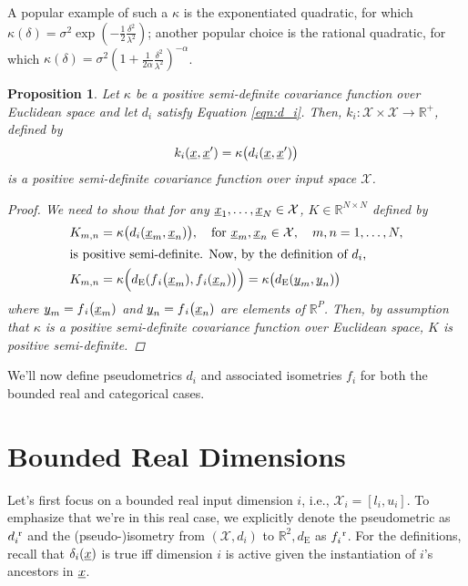 \documentclass{article}
\newcommand{\vect}[1]{\underline{\smash{#1}}}
\renewcommand{\v}[1]{\vect{#1}}
\newcommand{\reals}{\mathds{R}}
\newcommand{\sX}{\mathcal{X}}
\newcommand{\br}{^{\text{\textnormal{ r}}}}
\newtheorem{prop}[thm]{Proposition}
\begin{document}
A popular example of such a $\kappa$ is the exponentiated quadratic, for which $\kappa(\delta) = \sigma^2 \exp(-\frac{1}{2} \frac{\delta^2}{\lambda^2})$; another popular choice is the rational quadratic, for which $\kappa(\delta) = \sigma^2 (1+\frac{1}{2\alpha} \frac{\delta^2}{\lambda^2})^{-\alpha}$.


\begin{prop}
Let $\kappa$ be a positive semi-definite covariance function over Euclidean space and let $d_i$ satisfy Equation \ref{eqn:d_i}. Then, 
$k_i\colon \sX \times \sX\to \reals^+$, defined by 
\[k_i(\v{x},\v{x}') = \kappa\bigl( d_i(\v{x}, \v{x}') \bigr)\]
is a positive semi-definite covariance function over input space $\sX$. 
\label{prop:psd_if_isometry}
\begin{proof}
We need to show that for any $\v{x}_1, \dots, \v{x}_N \in \sX$, $K \in \reals^{N\times N}$ defined by
\begin{align*}
 K_{m, n} & = \kappa\bigl(d{_i}(\v{x}_m,\v{x}_n)\bigr)
,\quad \text{for }
\v{x}_m, \v{x}_n \in \sX,\quad m, n = 1, \ldots, N, 
\\
\intertext{is positive semi-definite. Now, by the definition of $d_i$,}
K_{m, n} & = \kappa\Bigl(d_{\text{E}}(f{_i}\bigl(\v{x}_m), f{_i}(\v{x}_n)\bigr)\Bigr) 
= \kappa\bigl(d_{\text{E}}(\v{y}_m, \v{y}_n)\bigr)
\end{align*}
where $\v{y}_m = f{_i}\bigl(\v{x}_m)$ and $\v{y}_n = f{_i}\bigl(\v{x}_n)$ are elements of $\reals^P$.
Then, by assumption that $\kappa$ is a positive semi-definite covariance function over Euclidean space, $K$ is positive semi-definite. 
\end{proof}
\end{prop}

We'll now define pseudometrics $d_i$ and associated isometries $f_i$ for both the bounded real and categorical cases. 


\section{Bounded Real Dimensions}


Let's first focus on a bounded real input dimension $i$, i.e., $\sX_i=[l_i, u_i]$.
To emphasize that we're in this real case, we explicitly denote the pseudometric as $d\br_i$ and the (pseudo-)isometry from $(\sX, d_i)$ to $\reals^2,d_\text{E}$ 
as $f\br_i$. For the definitions, recall that $\delta_i(\v{x})$ is true iff dimension $i$ is active given the instantiation of $i$'s ancestors in $\v{x}$.
\end{document}
